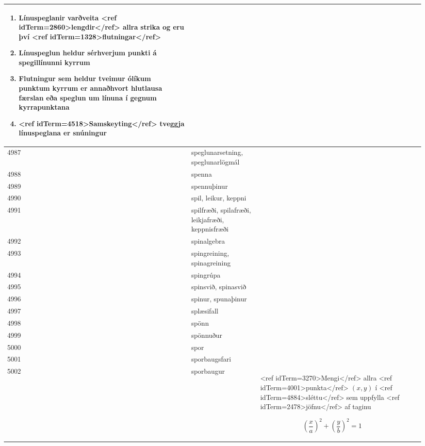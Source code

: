 \begin{longtable}{p{}|p{}|p{}|p{}|p{}}
\begin{enumerate}
    \item Línuspeglanir varðveita <ref idTerm=2860>lengdir</ref> allra strika og eru því <ref idTerm=1328>flutningar</ref>
    \item Línuspeglun heldur sérhverjum punkti á spegillínunni kyrrum
    \item Flutningur sem heldur tveimur ólíkum punktum kyrrum er annaðhvort hlutlausa færslan eða speglun um línuna í gegnum kyrrapunktana
    \item <ref idTerm=4518>Samskeyting</ref> tveggja línuspeglana er snúningur
\end{enumerate} &  \\
\hline
4987 & speglunarsetning, speglunarlögmál &  &  &  \\
\hline
4988 & spenna &  &  &  \\
\hline
4989 & spennuþinur &  &  &  \\
\hline
4990 & spil, leikur, keppni &  &  &  \\
\hline
4991 & spilfræði, spilafræði, leikjafræði, keppnisfræði &  &  &  \\
\hline
4992 & spinalgebra &  &  &  \\
\hline
4993 & spingreining, spinagreining &  &  &  \\
\hline
4994 & spingrúpa &  &  &  \\
\hline
4995 & spinsvið, spinasvið &  &  &  \\
\hline
4996 & spinur, spunaþinur &  &  &  \\
\hline
4997 & splæsifall &  &  &  \\
\hline
4998 & spönn &  &  &  \\
\hline
4999 & spönnuður &  &  &  \\
\hline
5000 & spor &  &  &  \\
\hline
5001 & sporbaugsfari &  &  &  \\
\hline
5002 & sporbaugur & <ref idTerm=3270>Mengi</ref> allra <ref idTerm=4001>punkta</ref> $(x,y)$ í <ref idTerm=4884>sléttu</ref> sem uppfylla <ref idTerm=2478>jöfnu</ref> af taginu 

\[ \left(\frac{x}{a}\right)^2 + \left(\frac{y}{b}\right)^2 = 1\]


\end{longtable}
